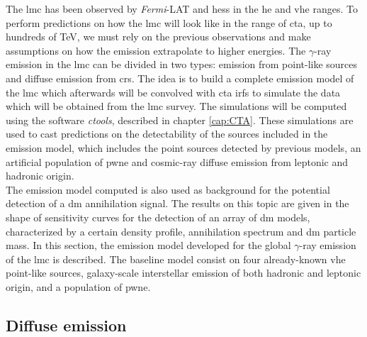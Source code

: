 \documentclass[main.tex]{subfiles}
\begin{document}
The \gls{lmc} has been observed by \textit{Fermi}-LAT and \gls{hess} in the \gls{he} and \gls{vhe} ranges. To perform predictions on how the \gls{lmc} will look like in the range of \gls{cta}, up to hundreds of TeV, we must rely on the previous observations and make assumptions on how the emission extrapolate to higher energies. The $\gamma$-ray emission in the \gls{lmc} can be divided in two types: emission from point-like sources and diffuse emission from \glspl{cr}. The idea is to build a complete emission model of the \gls{lmc} which afterwards will be convolved with \gls{cta} \glspl{irf} to simulate the data which will be obtained from the \gls{lmc} survey. The simulations will be computed using the software \textit{ctools}, described in chapter \ref{cap:CTA}. These simulations are used to cast predictions on the detectability of the sources included in the emission model, which includes the point sources detected by previous models, an artificial population of \gls{pwne} and cosmic-ray diffuse emission from leptonic and hadronic origin.\\
The emission model computed is also used as background for the potential detection of a \gls{dm} annihilation signal. The results on this topic are given in the shape of sensitivity curves for the detection of an array of \gls{dm} models, characterized by a certain density profile, annihilation spectrum and \gls{dm} particle mass.
In this section, the emission model developed for the global $\gamma$-ray emission of the \gls{lmc} is described. The baseline model consist on four already-known \gls{vhe} point-like sources, galaxy-scale interstellar emission of both hadronic and leptonic origin, and a population of \gls{pwne}. 

\subsection{Diffuse emission} \label{sec:diffusemodel}
\end{document}
